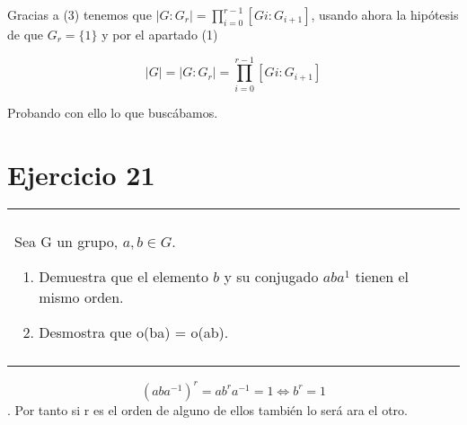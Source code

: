 \documentclass[12pt]{article}
\newenvironment{micaja}
{
    \begin{center}
    \begin{tabular}{|p{0.9\textwidth}|}
    \hline\\
    }   
    {   
    \\\\\hline
    \end{tabular} 
    \end{center}
    }
\begin{document}
Gracias a (3) tenemos que  $|G:G_r| = \prod_{i=0}^{r-1}[Gi:G_{i+1}]$, 
usando ahora la hipótesis de que $G_r=\{1\}$ y por el apartado (1)

$$|G| = |G:G_r| = \prod_{i=0}^{r-1}[Gi:G_{i+1}]$$

Probando con ello lo que buscábamos. 


\newpage

\section[Ejercicio 21]{Ejercicio 21}  
\begin{micaja}
    Sea G un grupo, $a,b \in G$. 
    \begin{enumerate}
\item  Demuestra que el elemento $b$ y su conjugado $aba^1$ tienen el mismo orden.  
\item Desmostra que o(ba) = o(ab).
    \end{enumerate}
\end{micaja}

$$(aba^{-1})^r = a b^r a^{-1} = 1  \Longleftrightarrow b^r = 1$$. 
Por tanto si r es el orden de alguno de ellos también lo será ara el otro.
\end{document}
